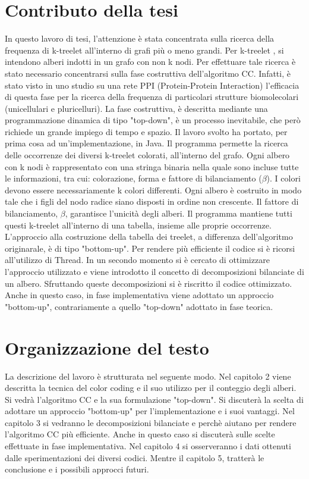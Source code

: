 \section{Contributo della tesi}

In questo lavoro di tesi, l'attenzione \`e stata concentrata sulla ricerca della frequenza di k-treelet all'interno di grafi pi\`u o meno grandi.
Per k-treelet , si intendono alberi indotti in un grafo con non k nodi.
Per effettuare tale ricerca \`e stato necessario concentrarsi sulla fase costruttiva dell'algoritmo CC.
Infatti, \`e stato visto in uno studio su una rete PPI (Protein-Protein Interaction) l'efficacia di questa fase per la ricerca della frequenza di particolari strutture biomolecolari (unicellulari e pluricelluri)\cite{alon2008biomolecular}.
La fase costruttiva, \`e descritta mediante una programmazione dinamica di tipo "top-down", \`e un processo inevitabile, che per\`o richiede un grande impiego di tempo e spazio.
Il lavoro svolto ha portato, per prima cosa ad un'implementazione, in Java.
Il programma permette la ricerca delle occorrenze dei diversi k-treelet colorati, all'interno del grafo.
Ogni albero con k nodi \`e rappresentato con una stringa binaria nella quale sono incluse tutte le informazioni, tra cui: colorazione, forma e fattore di bilanciamento ($\beta$).
I colori devono essere necessariamente k colori differenti.
Ogni albero \`e costruito in modo tale che i figli del nodo radice siano disposti in ordine non crescente.
Il fattore di bilanciamento, $\beta$, garantisce l'unicit\`a degli alberi.
Il programma mantiene tutti questi k-treelet all'interno di una tabella, insieme alle proprie occorrenze.
L'approccio alla costruzione della tabella dei treelet, a differenza dell'algoritmo originarale, \`e di tipo "bottom-up".
Per rendere pi\`u efficiente il codice si \`e ricorsi all'utilizzo di Thread.
In un secondo momento si \`e cercato di ottimizzare l'approccio utilizzato e viene introdotto il concetto di decomposizioni bilanciate di un albero.
Sfruttando queste decomposizioni si \`e riscritto il codice ottimizzato.
Anche in questo caso, in fase implementativa viene adottato un approccio "bottom-up", contrariamente a quello "top-down" adottato in fase teorica.




\section{Organizzazione del testo}

La descrizione del lavoro \`e strutturata nel seguente modo.
Nel capitolo 2 viene descritta la tecnica del color coding e il suo utilizzo per il conteggio degli alberi.
Si vedr\`a l'algoritmo CC e la sua formulazione "top-down". Si discuterà la scelta di adottare un approccio "bottom-up" per l'implementazione e i suoi vantaggi.
Nel capitolo 3 si vedranno le decomposizioni bilanciate e perch\`e aiutano per rendere l'algoritmo CC pi\`u efficiente. Anche in questo caso si discuterà sulle scelte effettuate in fase implementativa.
Nel capitolo 4 si osserveranno i dati ottenuti dalle sperimentazioni dei diversi codici.
Mentre il capitolo 5, tratter\`a le conclusione e i possibili approcci futuri.